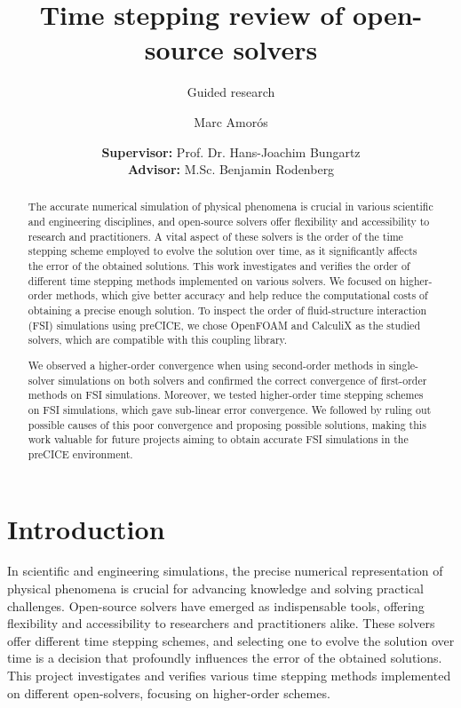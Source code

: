 \documentclass[
  english,        %
  font=times,     %
  onecolumn,      %
]{tumarticle}
\title{Time stepping review of open-source solvers}
\subtitle{Guided research}
\author[email=marc.amoros@tum.de]{Marc Amorós}
\date{
    \small
    \textbf{Supervisor:} Prof. Dr. Hans-Joachim Bungartz \\
    \textbf{Advisor:} M.Sc. Benjamin Rodenberg \\
}
\begin{document}
\maketitle

\begin{abstract}
    The accurate numerical simulation of physical phenomena is crucial in various scientific and engineering disciplines, and open-source solvers offer flexibility and accessibility to research and practitioners. A vital aspect of these solvers is the order of the time stepping scheme employed to evolve the solution over time, as it significantly affects the error of the obtained solutions. This work investigates and verifies the order of different time stepping methods implemented on various solvers. We focused on higher-order methods, which give better accuracy and help reduce the computational costs of obtaining a precise enough solution. To inspect the order of fluid-structure interaction (FSI) simulations using preCICE, we chose OpenFOAM and CalculiX as the studied solvers, which are compatible with this coupling library. 

    We observed a higher-order convergence when using second-order methods in single-solver simulations on both solvers and confirmed the correct convergence of first-order methods on FSI simulations. Moreover, we tested higher-order time stepping schemes on FSI simulations, which gave sub-linear error convergence. We followed by ruling out possible causes of this poor convergence and proposing possible solutions, making this work valuable for future projects aiming to obtain accurate FSI simulations in the preCICE environment.
\end{abstract}

\section{Introduction}
In scientific and engineering simulations, the precise numerical representation of physical phenomena is crucial for advancing knowledge and solving practical challenges. Open-source solvers have emerged as indispensable tools, offering flexibility and accessibility to researchers and practitioners alike. These solvers offer different time stepping schemes, and selecting one to evolve the solution over time is a decision that profoundly influences the error of the obtained solutions. This project investigates and verifies various time stepping methods implemented on different open-solvers, focusing on higher-order schemes.
    
\end{document}
